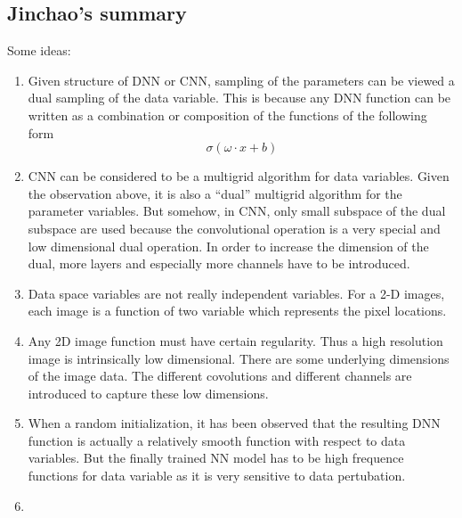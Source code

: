 \subsection{Jinchao's summary}

Some ideas:

\begin{enumerate}
\item Given structure of DNN or CNN, sampling of the parameters can be
  viewed a dual sampling of the data variable.  This is because any
  DNN function can be written as a combination or composition of the
  functions of the following form
$$
\sigma(\omega\cdot x+b)
$$

\item CNN can be considered to be a multigrid algorithm for data
  variables.  Given the observation above, it is also a ``dual''
  multigrid algorithm for the parameter variables.   But somehow, in
  CNN, only small subspace of the dual subspace are used because the
  convolutional operation is a very special and low dimensional dual
  operation.   In order to increase the dimension of the dual, more
  layers and especially more channels have to be introduced. 

\item Data space variables are not really independent variables.  For
  a  2-D images, each image is a function of two variable which
  represents the pixel locations. 

\item Any 2D image function must have certain regularity. Thus a high
  resolution image is intrinsically low dimensional.   There are some
  underlying dimensions of the image data.  The different covolutions
  and different channels are introduced to capture these low
  dimensions. 

\item When a random initialization, it has been observed that the
  resulting DNN function is actually a relatively smooth function with
  respect to data variables. 
  But the finally trained NN model has to be high frequence functions
  for data variable as it is very sensitive to data pertubation. 

\item 
\end{enumerate}
